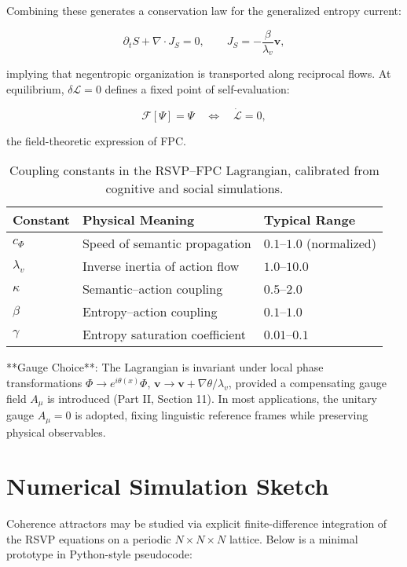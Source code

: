\documentclass[12pt,a4paper]{article}
\begin{document}
Combining these generates a conservation law for the generalized entropy current:

\begin{equation}
\partial_t S + \nabla\!\cdot\! J_S = 0,
\qquad
J_S = -\frac{\beta}{\lambda_v} \bm{v},
\end{equation}

implying that negentropic organization is transported along reciprocal flows. At equilibrium, $\delta \mathcal{L} = 0$ defines a fixed point of self-evaluation:

\begin{equation}
\mathcal{F}[\Psi] = \Psi \quad \Leftrightarrow \quad \dot{\mathcal{L}} = 0,
\end{equation}

the field-theoretic expression of FPC.

\begin{table}[h]
\centering
\begin{tabular}{@{}lll@{}}
\toprule
\textbf{Constant} & \textbf{Physical Meaning} & \textbf{Typical Range} \\
\midrule
$c_\Phi$ & Speed of semantic propagation & $0.1$--$1.0$ (normalized) \\
$\lambda_v$ & Inverse inertia of action flow & $1.0$--$10.0$ \\
$\kappa$ & Semantic--action coupling & $0.5$--$2.0$ \\
$\beta$ & Entropy--action coupling & $0.1$--$1.0$ \\
$\gamma$ & Entropy saturation coefficient & $0.01$--$0.1$ \\
\bottomrule
\end{tabular}
\caption{Coupling constants in the RSVP--FPC Lagrangian, calibrated from cognitive and social simulations.}
\end{table}

**Gauge Choice**: The Lagrangian is invariant under local phase transformations $\Phi \to e^{i\theta(x)}\Phi$, $\bm{v} \to \bm{v} + \nabla \theta / \lambda_v$, provided a compensating gauge field $A_\mu$ is introduced (Part II, Section 11). In most applications, the unitary gauge $A_\mu = 0$ is adopted, fixing linguistic reference frames while preserving physical observables.

\section{Numerical Simulation Sketch}

Coherence attractors may be studied via explicit finite-difference integration of the RSVP equations on a periodic $N \times N \times N$ lattice. Below is a minimal prototype in Python-style pseudocode:
\end{document}
